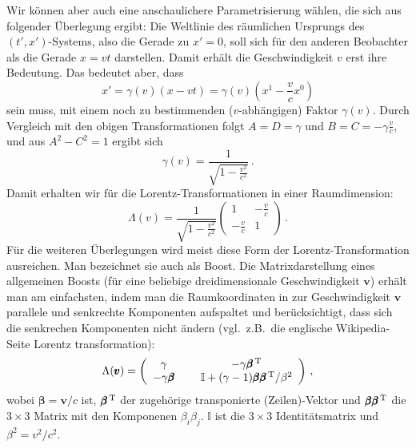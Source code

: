 Wir k\"onnen aber auch eine
anschaulichere Parametrisierung w\"ahlen,
die sich aus folgender \"Uberlegung ergibt:
Die Weltlinie des r\"aumlichen Ursprungs 
des $(t',x')$-Systems,
also die Gerade zu $x'=0$, soll sich f\"ur den anderen 
Beobachter als die Gerade $x=vt$ darstellen. 
Damit erh\"alt die Geschwindigkeit $v$
erst ihre Bedeutung. Das bedeutet aber, dass
\begin{equation}
         x' = \gamma(v) (x - v t) = \gamma(v) 
         \left( x^1 - \frac{v}{c} x^0 \right)  
\end{equation}
sein muss, mit einem noch zu bestimmenden ($v$-abh\"angigen)
Faktor $\gamma(v)$. Durch Vergleich mit den obigen
Transformationen folgt $A=D=\gamma$ und
$B=C=- \gamma \frac{v}{c}$, und aus $A^2 - C^2=1$ ergibt
sich
\begin{equation}
            \gamma(v) = \frac{1}{\sqrt{1 - \frac{v^2}{c^2}}}   \, .
\end{equation} 
Damit erhalten wir f\"ur die Lorentz-Transformationen
in einer Raumdimension:
\begin{equation}
           \Lambda(v) = \frac{1}{\sqrt{1 - \frac{v^2}{c^2}}} \left( \begin{array}{cc}
           1 & - \frac{v}{c} \\ - \frac{v}{c} & 1 \end{array} \right) \, .
\end{equation}
F\"ur die weiteren \"Uberlegungen wird meist diese
Form der Lorentz-Transformation ausreichen.
Man bezeichnet sie auch als \glqq Boost\grqq.
Die Matrixdarstellung eines allgemeinen Boosts 
(f\"ur eine beliebige dreidimensionale 
Geschwindigkeit $\pmb{v}$) erh\"alt man am
einfachsten, indem man die Raumkoordinaten 
in zur Geschwindigkeit $\pmb{v}$ parallele und
senkrechte Komponenten aufspaltet und
ber\"ucksichtigt, dass sich die senkrechen
Komponenten nicht \"andern (vgl.\ z.B.\
die englische Wikipedia-Seite 
\glqq Lorentz transformation\grqq):
\begin{equation}
    \Lambda(\pmb{v}) = \left( \begin{array}{cc} 
  \gamma ~~&~~ - \gamma \pmb{\beta}^{\,\rm T} \\
  - \gamma \pmb{\beta} ~~&~~ \mathbb{I} +
   (\gamma - 1) \pmb{\beta}\pmb{\beta}^{\,\rm T}/\beta^2  
    \end{array} \right)  \, ,
\end{equation}
wobei $\pmb{\beta}=\pmb{v}/c$ ist, $\pmb{\beta}^{\,\rm T}$
der zugeh\"orige transponierte (Zeilen)-Vektor und 
$\pmb{\beta}\pmb{\beta}^{\,\rm T}$ die $3\times 3$ Matrix 
mit den Komponenen $\beta_i \beta_j$. 
$\mathbb{I}$ ist die $3\times 3$ Identit\"atsmatrix
und $\beta^2=v^2/c^2$. 

